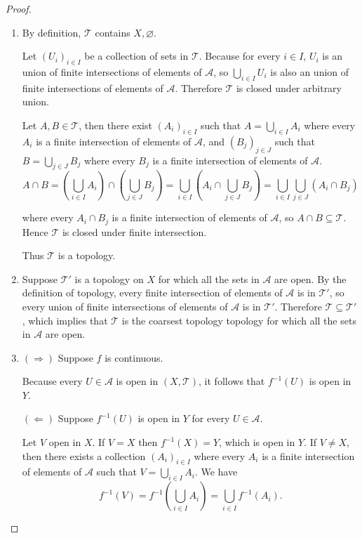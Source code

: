 \begin{proof}
	\begin{enumerate}[label={(\alph*)}]
		\item By definition, $\mathscr{T}$ contains $X, \varnothing$.

		      Let ${(U_{i})}_{i\in I}$ be a collection of sets in $\mathscr{T}$. Because for every $i\in I$, $U_{i}$ is an union of finite intersections of elements of $\mathscr{A}$, so $\bigcup_{i\in I}U_{i}$ is also an union of finite intersections of elements of $\mathscr{A}$. Therefore $\mathscr{T}$ is closed under arbitrary union.

		      Let $A, B\in\mathscr{T}$, then there exist ${(A_{i})}_{i\in I}$ such that $A = \bigcup_{i\in I}A_{i}$ where every $A_{i}$ is a finite intersection of elements of $\mathscr{A}$, and ${(B_{j})}_{j\in J}$ such that $B = \bigcup_{j\in J}B_{j}$ where every $B_{j}$ is a finite intersection of elements of $\mathscr{A}$.
		      \[
			      A\cap B = \left(\bigcup_{i\in I}A_{i}\right)\cap \left(\bigcup_{j\in J}B_{j}\right) = \bigcup_{i\in I}\left(A_{i}\cap \bigcup_{j\in J}B_{j}\right) = \bigcup_{i\in I}\bigcup_{j\in J}\left(A_{i}\cap B_{j}\right)
		      \]

		      where every $A_{i}\cap B_{j}$ is a finite intersection of elements of $\mathscr{A}$, so $A\cap B\subseteq \mathscr{T}$. Hence $\mathscr{T}$ is closed under finite intersection.

		      Thus $\mathscr{T}$ is a topology.
		\item Suppose $\mathscr{T}'$ is a topology on $X$ for which all the sets in $\mathscr{A}$ are open. By the definition of topology, every finite intersection of elements of $\mathscr{A}$ is in $\mathscr{T}'$, so every union of finite intersections of elements of $\mathscr{A}$ is in $\mathscr{T}'$. Therefore $\mathscr{T}\subseteq \mathscr{T}'$, which implies that $\mathscr{T}$ is the coarsest topology topology for which all the sets in $\mathscr{A}$ are open.
		\item $(\Longrightarrow)$ Suppose $f$ is continuous.

		      Because every $U\in\mathscr{A}$ is open in $(X, \mathscr{T})$, it follows that $f^{-1}(U)$ is open in $Y$.

		      $(\Longleftarrow)$ Suppose $f^{-1}(U)$ is open in $Y$ for every $U\in\mathscr{A}$.

		      Let $V$ open in $X$. If $V = X$ then $f^{-1}(X) = Y$, which is open in $Y$. If $V\ne X$, then there exists a collection ${(A_{i})}_{i\in I}$ where every $A_{i}$ is a finite intersection of elements of $\mathscr{A}$ such that $V = \bigcup_{i\in I}A_{i}$. We have
		      \[
			      f^{-1}(V) = f^{-1}\left(\bigcup_{i\in I}A_{i}\right) = \bigcup_{i\in I}f^{-1}(A_{i}).
		      \]


\end{enumerate}
\end{proof}
